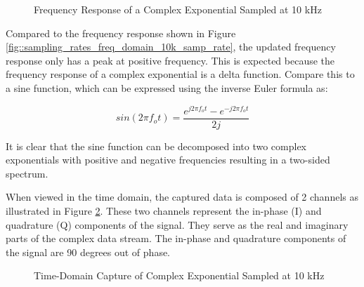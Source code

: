 \documentclass{article}
\begin{document}
\begin{figure}[H]
	\centerline{}
	\caption{Frequency Response of a Complex Exponential Sampled at 10 kHz}
	\label{fig::complex_sampling_freq_domain_10k_samp_rate}
\end{figure}

Compared to the frequency response shown in Figure \ref{fig::sampling_rates_freq_domain_10k_samp_rate}, the updated frequency response only has a peak at positive frequency. This is expected because the frequency response of a complex exponential is a delta function. Compare this to a sine function, which can be expressed using the inverse Euler formula as:

\begin{equation}
	sin(2{\pi}{f_o}t) = \frac{e^{j2{\pi}{f_o}t} - e^{-j2{\pi}{f_o}t}}{2j}
\end{equation}

It is clear that the sine function can be decomposed into two complex exponentials with positive and negative frequencies resulting in a two-sided spectrum.

When viewed in the time domain, the captured data is composed of 2 channels as illustrated in Figure \ref{fig::complex_sampling_time_domain_10k_samp_rate}. These two channels represent the in-phase (I) and quadrature (Q) components of the signal. They serve as the real and imaginary parts of the complex data stream. The in-phase and quadrature components of the signal are 90 degrees out of phase.

\begin{figure}[H]
	\centerline{}
	\caption{Time-Domain Capture of Complex Exponential Sampled at 10 kHz}
	\label{fig::complex_sampling_time_domain_10k_samp_rate}
\end{figure}
\end{document}

